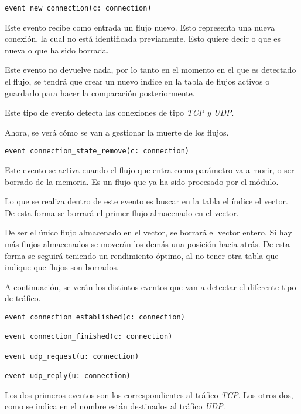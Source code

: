 \begin{lstlisting}[style=CodigoC]
event new_connection(c: connection)

\end{lstlisting}

\intro Este evento recibe como entrada un flujo nuevo. Esto representa una nueva conexión, la cual no está identificada 
previamente. Esto quiere decir o que es nueva o que ha sido borrada.

\intro Este evento no devuelve nada, por lo tanto en el momento en el que es detectado el flujo, se tendrá que crear 
un nuevo indice en la tabla de flujos activos o guardarlo para hacer la comparación posteriormente.

\intro Este tipo de evento detecta las conexiones de tipo \textit{TCP y UDP}.

\intro Ahora, se verá cómo se van a gestionar la muerte de los flujos.

\begin{lstlisting}[style=CodigoC]
event connection_state_remove(c: connection)

\end{lstlisting}

\intro Este evento se activa cuando el flujo que entra como parámetro va a morir, o ser borrado de la memoria. Es un flujo 
que ya ha sido procesado por el módulo.

\intro Lo que se realiza dentro de este evento es buscar en la tabla el índice el vector. De esta forma 
se borrará el primer flujo almacenado en el vector.

\intro De ser el único flujo almacenado en el vector, se borrará el vector entero. Si hay más flujos almacenados 
se moverán los demás una posición hacia atrás. De esta forma se seguirá teniendo un rendimiento óptimo, al no tener otra tabla que 
indique que flujos son borrados.

\intro A continuación, se verán los distintos eventos que van a detectar el diferente tipo de tráfico.

\begin{lstlisting}[style=CodigoC]
event connection_established(c: connection)

event connection_finished(c: connection)

event udp_request(u: connection)

event udp_reply(u: connection)

\end{lstlisting}

\intro Los dos primeros eventos son los correspondientes al tráfico \textit{TCP}. Los otros dos, como se indica  
en el nombre están destinados al tráfico \textit{UDP}.

